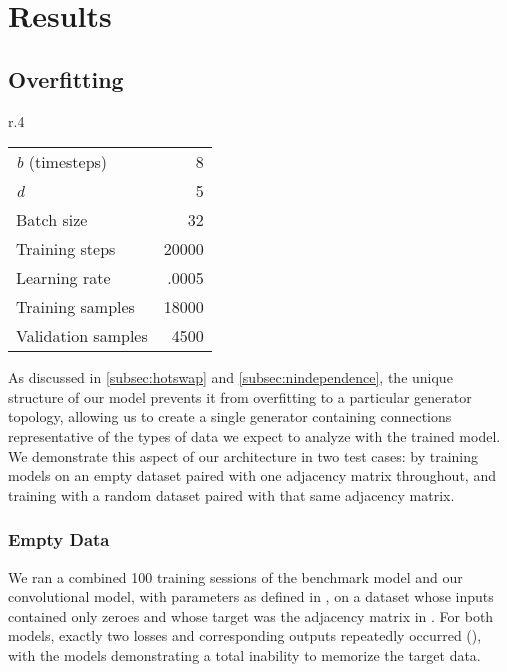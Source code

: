 \graphicspath{ {resources/models/} } 

\chapter{Results}
\label{results}
\section{Overfitting}
\label{sec:overfitting}
\setlength{\columnsep}{20pt}
\begin{wraptable}[8]{r}{.4\textwidth}
	\captionsetup{justification=centering}
	\vspace{-20pt}
	\begin{tabular}{lr}
		\textit{b} (timesteps) & 8\\
		\textit{d}& 5\\
		Batch size& 32\\
		Training steps& 20000\\
		Learning rate& .0005\\
		Training samples& 18000\\
		Validation samples& 4500
	\end{tabular}
	\vspace{-5pt}
	\label{fig:nullparams}
\end{wraptable}
As discussed in \ref{subsec:hotswap} and \ref{subsec:nindependence}, the unique 
structure of our model prevents it from overfitting to a particular generator 
topology, allowing us to create a single generator containing connections 
representative of the types of data we expect to analyze with the trained model.
We demonstrate this aspect of our architecture in two test cases: by training 
models on an empty dataset paired with one adjacency matrix throughout, and 
training with a random dataset paired with that same adjacency matrix.

\subsection{Empty Data}
\label{subsec:empty}
We ran a combined 100 training sessions of the benchmark model and our 
convolutional model, with parameters as defined in , on a 
dataset whose inputs contained only zeroes and whose target was the adjacency 
matrix in . For both models, exactly two losses 
and corresponding outputs repeatedly occurred (), with 
the models demonstrating a total inability to memorize the target data.

